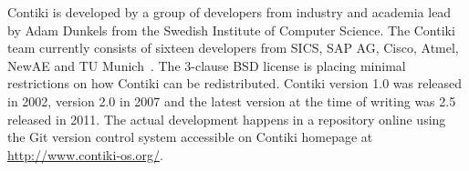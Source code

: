 Contiki is developed by a group of developers from industry and academia
lead by Adam Dunkels from the Swedish Institute of Computer Science.
The Contiki team currently consists of sixteen developers from SICS,
SAP AG, Cisco, Atmel, NewAE and TU Munich~\cite{contiki-docs}.
The 3-clause BSD license is placing minimal restrictions on how Contiki can be redistributed.
Contiki version 1.0 was released in 2002, version 2.0 in 2007 and the latest version
at the time of writing was 2.5 released in 2011.
The actual development happens in a repository online using the Git version control system
accessible on Contiki homepage at \url{http://www.contiki-os.org/}.











